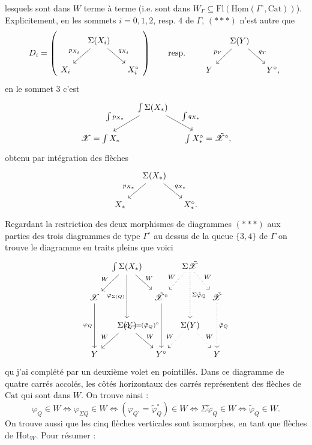 \documentclass[11pt]{article}
\newcommand{\printedpage}[1]{\marginpar{\footnotesize p.~#1}}
\newcommand{\msp}[1]{\marginpar{\footnotesize [#1]}}
\newcommand{\Hot}{\mathrm{Hot}}
\newcommand{\Cat}{\mathrm{Cat}}
\newcommand{\sX}{\mathscr{X}}
\newcommand{\Hom}{\mathrm{Hom}}
\newcommand{\Fl}{\mathrm{Fl}}
\newcommand{\tsX}{\tilde{\mathscr{X}}}
\begin{document}
lesquels sont dans $W$ terme à terme (i.e. sont dans $W_\Gamma\subseteq\Fl(\underline{\Hom}(\Gamma^\circ,\Cat))$). Explicitement, en les sommets $i=0,1,2$, resp. $4$ de $\Gamma$, $(***)$ n'est autre que
\[
D_i =
\left(
\begin{tikzcd}[column sep=small]
 & \Sigma(X_i) \arrow[dl, "p_{X_i}"'] \arrow[dr, "q_{X_i}"] & \\
X_i & & X_i^\circ
\end{tikzcd}
\right)
\qquad \text{resp.} \qquad
\begin{tikzcd}[column sep=small]
 & \Sigma(Y) \arrow[dl, "p_Y"'] \arrow[dr, "q_Y"] & \\
Y & & Y^\circ,
\end{tikzcd}
\]
en le sommet 3 c'est
\[
\begin{tikzcd}[column sep=small]
 & \int\Sigma(X_*) \arrow[dl, "\int p_{X_*}"'] \arrow[dr, "\int q_{X_*}"] & \\
\sX=\int X_* & & \int X_*^\circ=\tsX^\circ,
\end{tikzcd}
\]
obtenu par intégration des flèches
\[
\begin{tikzcd}[column sep=small]
 & \Sigma(X_*) \arrow[dl, "p_{X_*}"'] \arrow[dr, "q_{X_*}"] & \\
X_* & & X_*^\circ.
\end{tikzcd}
\]
\msp{page 140}
Regardant la restriction des deux morphismes de diagrammes $(***)$ aux parties des trois diagrammes de type $\Gamma^\circ$ au dessus de la queue $\{3,4\}$ de $\Gamma$ on trouve le diagramme en traits pleins que voici
\[
\begin{tikzcd}[column sep=tiny, row sep=normal]
 & \int\Sigma(X_*) \arrow[dl, "W"'] \arrow[dr, "W"] \arrow[dd, "\varphi_{\Sigma(Q)}"'] & & \Sigma\tsX \arrow[dl, dotted, "W"'] \arrow[dr, dotted, "W"] \arrow[dd, dotted, "\Sigma\tilde{\varphi}_Q"] & \\
\sX \arrow[dd, "\varphi_Q"'] & & \tsX^\circ \arrow[dd, "\varphi_{Q^\circ}=(\tilde{\varphi}_Q)^\circ"'] & & \tsX \arrow[dd, dotted, "\tilde{\varphi}_Q"] \\
 & \Sigma(Y) \arrow[dl, "W"'] \arrow[dr, "W"] & & \Sigma(Y) \arrow[dl, dotted, "W"'] \arrow[dr, dotted, "W"] & \\
Y & & Y^\circ & & Y
\end{tikzcd}
\]
\printedpage{96}
qu j'ai complété par un deuxième volet en pointillés. Dans ce diagramme de quatre carrés accolés, les côtés horizontaux des carrés représentent des flèches de $\Cat$ qui sont dans $W$. On trouve ainsi : %
\[
\varphi_Q\in W \iff \varphi_{\Sigma Q}\in W \iff (\varphi_{Q^\circ}=\tilde{\varphi}_Q^\circ)\in W \iff \Sigma\tilde{\varphi}_Q\in W \iff \tilde{\varphi}_Q\in W.
\]
On trouve aussi que les cinq flèches verticales sont isomorphes, en tant que flèches de $\Hot_W$. Pour résumer :
\end{document}
